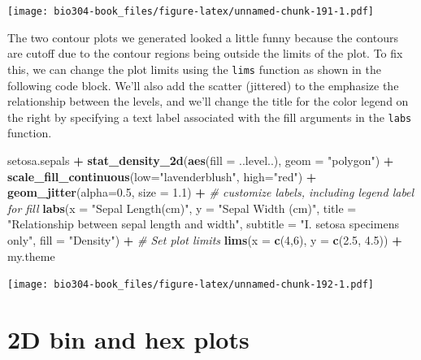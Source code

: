 \documentclass[]{book}
\newenvironment{Shaded}{\begin{snugshade}}{\end{snugshade}}
\newcommand{\CommentTok}[1]{\textcolor[rgb]{0.56,0.35,0.01}{\textit{#1}}}
\newcommand{\DataTypeTok}[1]{\textcolor[rgb]{0.13,0.29,0.53}{#1}}
\newcommand{\DecValTok}[1]{\textcolor[rgb]{0.00,0.00,0.81}{#1}}
\newcommand{\FloatTok}[1]{\textcolor[rgb]{0.00,0.00,0.81}{#1}}
\newcommand{\KeywordTok}[1]{\textcolor[rgb]{0.13,0.29,0.53}{\textbf{#1}}}
\newcommand{\NormalTok}[1]{#1}
\newcommand{\OperatorTok}[1]{\textcolor[rgb]{0.81,0.36,0.00}{\textbf{#1}}}
\newcommand{\StringTok}[1]{\textcolor[rgb]{0.31,0.60,0.02}{#1}}
\theoremstyle{definition}
\theoremstyle{definition}
\theoremstyle{definition}
\theoremstyle{remark}
\begin{document}
\texttt{[image: bio304-book\_files/figure-latex/unnamed-chunk-191-1.pdf]}

The two contour plots we generated looked a little funny because the
contours are cutoff due to the contour regions being outside the limits
of the plot. To fix this, we can change the plot limits using the
\texttt{lims} function as shown in the following code block. We'll also
add the scatter (jittered) to the emphasize the relationship between the
levels, and we'll change the title for the color legend on the right by
specifying a text label associated with the fill arguments in the
\texttt{labs} function.

\begin{Shaded}
\begin{Highlighting}[]
\NormalTok{setosa.sepals }\OperatorTok{+}\StringTok{ }
\StringTok{  }\KeywordTok{stat_density_2d}\NormalTok{(}\KeywordTok{aes}\NormalTok{(}\DataTypeTok{fill =}\NormalTok{ ..level..), }\DataTypeTok{geom =} \StringTok{"polygon"}\NormalTok{) }\OperatorTok{+}
\StringTok{  }\KeywordTok{scale_fill_continuous}\NormalTok{(}\DataTypeTok{low=}\StringTok{"lavenderblush"}\NormalTok{, }\DataTypeTok{high=}\StringTok{"red"}\NormalTok{) }\OperatorTok{+}
\StringTok{  }\KeywordTok{geom_jitter}\NormalTok{(}\DataTypeTok{alpha=}\FloatTok{0.5}\NormalTok{, }\DataTypeTok{size =} \FloatTok{1.1}\NormalTok{) }\OperatorTok{+}
\StringTok{  }
\StringTok{  }\CommentTok{# customize labels, including legend label for fill}
\StringTok{  }\KeywordTok{labs}\NormalTok{(}\DataTypeTok{x =} \StringTok{"Sepal Length(cm)"}\NormalTok{, }\DataTypeTok{y =} \StringTok{"Sepal Width (cm)"}\NormalTok{,}
       \DataTypeTok{title =} \StringTok{"Relationship between sepal length and width"}\NormalTok{,}
       \DataTypeTok{subtitle =} \StringTok{"I. setosa specimens only"}\NormalTok{,}
       \DataTypeTok{fill =} \StringTok{"Density"}\NormalTok{) }\OperatorTok{+}
\StringTok{  }
\StringTok{  }\CommentTok{# Set plot limits}
\StringTok{  }\KeywordTok{lims}\NormalTok{(}\DataTypeTok{x =} \KeywordTok{c}\NormalTok{(}\DecValTok{4}\NormalTok{,}\DecValTok{6}\NormalTok{), }\DataTypeTok{y =} \KeywordTok{c}\NormalTok{(}\FloatTok{2.5}\NormalTok{, }\FloatTok{4.5}\NormalTok{)) }\OperatorTok{+}
\StringTok{  }\NormalTok{my.theme }
\end{Highlighting}
\end{Shaded}

\texttt{[image: bio304-book\_files/figure-latex/unnamed-chunk-192-1.pdf]}

\hypertarget{d-bin-and-hex-plots}{%
\section{2D bin and hex plots}\label{d-bin-and-hex-plots}}
\end{document}

